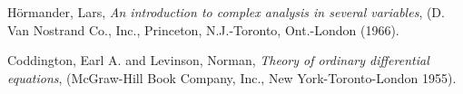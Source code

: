 \documentclass[a4paper,11pt]{article}
\theoremstyle{remark}
\begin{document}
\begin{thebibliography}{10}

{\sc H\"ormander, Lars},
{\it An introduction to complex analysis in several variables}, 
(D. Van Nostrand Co., Inc., Princeton, N.J.-Toronto, Ont.-London (1966).

{\sc Coddington, Earl A. and Levinson, Norman},
{\it Theory of ordinary differential equations},
(McGraw-Hill Book Company, Inc., New York-Toronto-London 1955).

% 
% 
% 
% 
% 
% 
% 
% 
% 
% 

\end{thebibliography}
\end{document}
